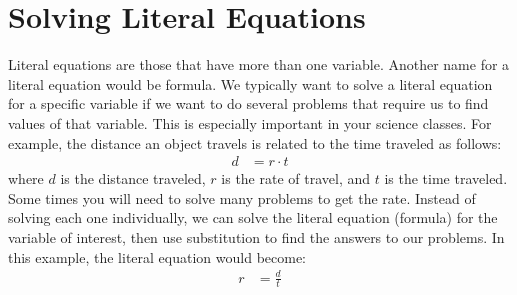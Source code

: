 \section{Solving Literal Equations}
Literal equations are those that have more than one variable. Another name for a literal equation would be formula. We typically want to solve a literal equation for a specific variable if we want to do several problems that require us to find values of that variable. This is especially important in your science classes. For example, the distance an object travels is related to the time traveled as follows:
\begin{align*}
    d&=r\cdot t
\end{align*}
where $d$ is the distance traveled, $r$ is the rate of travel, and $t$ is the time traveled. Some times you will need to solve many problems to get the rate. Instead of solving each one individually, we can solve the literal equation (formula) for the variable of interest, then use substitution to find the answers to our problems. In this example, the literal equation would become:
\begin{align*}
    r&=\frac{d}{t}
\end{align*}
